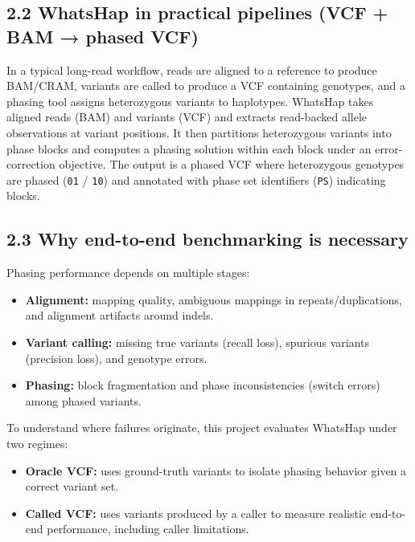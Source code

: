 \documentclass[
]{article}
\providecommand{\tightlist}{%
  \setlength{\itemsep}{0pt}\setlength{\parskip}{0pt}}
\begin{document}
\subsection{2.2 WhatsHap in practical pipelines (VCF + BAM → phased
VCF)}\label{whatshap-in-practical-pipelines-vcf-bam-phased-vcf}

In a typical long-read workflow, reads are aligned to a reference to
produce BAM/CRAM, variants are called to produce a VCF containing
genotypes, and a phasing tool assigns heterozygous variants to
haplotypes. WhatsHap takes aligned reads (BAM) and variants (VCF) and
extracts read-backed allele observations at variant positions. It then
partitions heterozygous variants into phase blocks and computes a
phasing solution within each block under an error-correction objective.
The output is a phased VCF where heterozygous genotypes are phased
(\texttt{0\textbar{}1} / \texttt{1\textbar{}0}) and annotated with phase
set identifiers (\texttt{PS}) indicating blocks.

\subsection{2.3 Why end-to-end benchmarking is
necessary}\label{why-end-to-end-benchmarking-is-necessary}

Phasing performance depends on multiple stages:

\begin{itemize}
\tightlist
\item
  \textbf{Alignment:} mapping quality, ambiguous mappings in
  repeats/duplications, and alignment artifacts around indels.
\item
  \textbf{Variant calling:} missing true variants (recall loss),
  spurious variants (precision loss), and genotype errors.
\item
  \textbf{Phasing:} block fragmentation and phase inconsistencies
  (switch errors) among phased variants.
\end{itemize}

To understand where failures originate, this project evaluates WhatsHap
under two regimes:

\begin{itemize}
\tightlist
\item
  \textbf{Oracle VCF:} uses ground-truth variants to isolate phasing
  behavior given a correct variant set.
\item
  \textbf{Called VCF:} uses variants produced by a caller to measure
  realistic end-to-end performance, including caller limitations.
\end{itemize}
\end{document}

